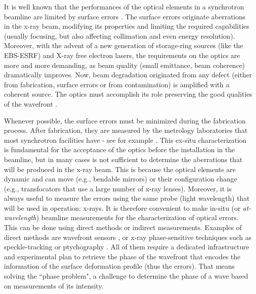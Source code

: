 \documentclass[preprint]{iucr}
\newcommand{\inred}[1]{{\color{red}#1}}
\begin{document}
It is well known that the performances of the optical elements in  a synchrotron beamline are limited by surface errors \inred{\cite{Yabashi2014, Schroer2014, Cocco2022}}. The surface errors originate aberrations in the x-ray beam, modifying its properties and limiting the required capabilities (usually focusing, but also affecting collimation and even energy resolution). Moreover, with the advent of a new generation of storage-ring sources (like the EBS-ESRF) and X-ray free electron lasers, the requirements on the optics are more and more demanding, as beam quality (small emittance, beam coherence) dramatically improves. Now, beam degradation originated \inred{from} any defect (either from fabrication, surface errors or from contamination) is amplified with a coherent source. The optics must accomplish its role preserving the good qualities of the wavefront \cite{Cocco2022}. 

Whenever possible, the surface errors must be minimized during the fabrication process. After fabrication, they are measured by the metrology laboratories that most synchrotron facilities have - \inred{see for example \cite{round_robin1, round_robin2, round_robin3}}. This ex-situ characterization is fundamental for the \inred{acceptance} of the optics \inred{before} the installation in the beamline, but in many cases \inred{is} not sufficient to determine the aberrations that will \inred{be produced} in the x-ray beam. This is because the optical elements are dynamic and can move (e.g., bendable \inred{mirrors}) or their configuration change (e.g., transfocators that use a large number of x-ray lenses). Moreover, it is always useful to measure the errors using the same probe (light wavelength) that will be used in operation: x-rays. It is therefore convenient to make in-situ (or \textit{at-wavelength}) beamline measurements for the characterization of optical errors. \inred{This can be done using direct methods or indirect measurements. Examples of direct methods are} wavefront sensors \inred{\cite{Mercere2005, Mikhaylov2020}, or x-ray phase-sensitive techniques such as speckle-tracking \cite{berujon_theory_2020, berujon_experiments_2020} or ptychography \cite{Schropp2013}}. \inred{All of them require a dedicated infrastructure and experimental plan \inred{to retrieve the phase of the wavefront that encodes the information of the surface deformation profile (thus the errors)}. That means solving the ``phase problem", a challenge to determine the phase of a wave based on measurements of its intensity.}
\end{document}
